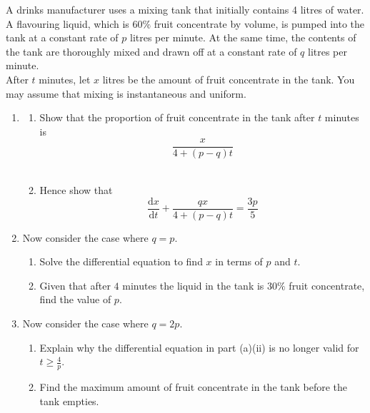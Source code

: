 \documentclass[leqno]{article}
\begin{document}
\begin{enumerate}[
  label=\textbf{\arabic*.},
  leftmargin=*,
  topsep=0pt,
  partopsep=0pt,
  parsep=0pt
]
\newpage

\questionitem

A drinks manufacturer uses a mixing tank that initially contains 4 litres of water. A flavouring liquid, which is $60\%$ fruit concentrate by volume, is pumped into the tank at a constant rate of $p$ litres per minute. At the same time, the contents of the tank are thoroughly mixed and drawn off at a constant rate of $q$ litres per minute. \\

After $t$ minutes, let $x$ litres be the amount of fruit concentrate in the tank. You may assume that mixing is instantaneous and uniform. \\

\begin{enumerate}[label=\textbf{(\alph*)}]
  \item
  \begin{enumerate}[label=(\roman*)]
    \item Show that the proportion of fruit concentrate in the tank after $t$ minutes is
    \[
    \frac{x}{4+(p-q)t}
    \]
     \\
    \item Hence show that
    \[
    \frac{\mathrm{d}x}{\mathrm{d}t}+\frac{q x}{4+(p-q)t}=\frac{3p}{5}
    \]
  \end{enumerate}
  \item Now consider the case where $q=p$. \\
  \begin{enumerate}[label=(\roman*)]
    \item Solve the differential equation to find $x$ in terms of $p$ and $t$.  \\
    \item Given that after $4$ minutes the liquid in the tank is $30\%$ fruit concentrate, find the value of $p$.  \\
  \end{enumerate}
  \item Now consider the case where $q=2p$. \\
  \begin{enumerate}[label=(\roman*)]
    \item Explain why the differential equation in part (a)(ii) is no longer valid for $t\geq \frac{4}{p}$.  \\
    \item Find the maximum amount of fruit concentrate in the tank before the tank empties.  \\
  \end{enumerate}
\end{enumerate}


\end{enumerate}
\end{document}
